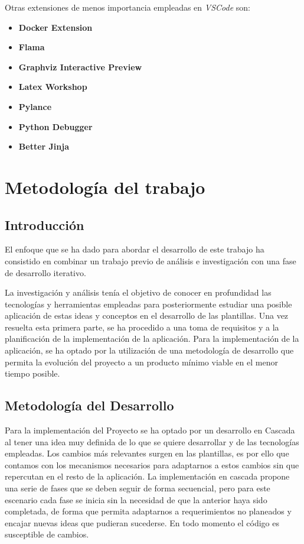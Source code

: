\documentclass[12pt, a4paper, twoside]{article}
\begin{document}
Otras extensiones de menos importancia empleadas en \textit{VSCode} son:
\begin{itemize}
    \item \textbf{Docker Extension}
    \item \textbf{Flama}
    \item \textbf{Graphviz Interactive Preview}
    \item \textbf{Latex Workshop}
    \item \textbf{Pylance}
    \item \textbf{Python Debugger}
    \item \textbf{Better Jinja}
\end{itemize}














\section{Metodología del trabajo}
\label{sec:Metodologia}
\subsection{Introducción}
El enfoque que se ha dado para abordar el desarrollo de este trabajo ha consistido en combinar un trabajo previo de análisis e investigación con una fase de desarrollo iterativo.

La investigación y análisis tenía el objetivo de conocer en profundidad las tecnologías y herramientas empleadas 
para posteriormente estudiar una posible aplicación de estas ideas y conceptos en el desarrollo de las plantillas.
Una vez resuelta esta primera parte, se ha procedido a una toma de requisitos y a la planificación de la implementación de la aplicación. Para la implementación de la aplicación, se ha optado por la utilización de una metodología de desarrollo que permita la evolución del proyecto a un producto mínimo viable en el menor tiempo posible.
\subsection{Metodología del Desarrollo}
Para la implementación del Proyecto se ha optado por un desarrollo en Cascada al tener una idea muy definida de lo que se quiere desarrollar y de las tecnologías empleadas.
Los cambios más relevantes surgen en las plantillas, es por ello que contamos con los mecanismos necesarios para adaptarnos a estos cambios sin que repercutan en el resto de la aplicación.
La implementación en cascada propone una serie de fases que se deben seguir de forma secuencial, pero para este escenario cada fase se inicia sin la necesidad de que la anterior haya sido completada, de forma que permita adaptarnos a requerimientos no planeados y encajar nuevas ideas que pudieran sucederse. En todo momento el código es susceptible de cambios.
\end{document}
